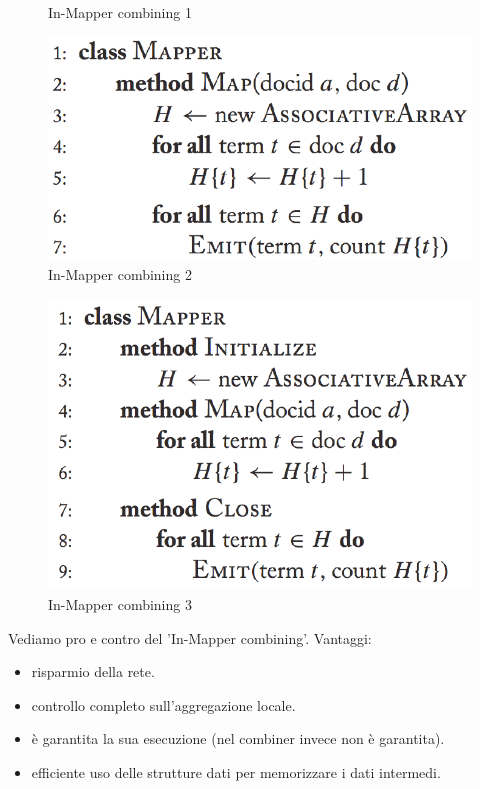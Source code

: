 \documentclass{article}
\begin{document}
\begin{appendices}
\begin{figure}[H]
    \caption{In-Mapper combining 1}
    \label{Code1}
\end{figure}
\begin{figure}[H]
    \centering
    \includegraphics[scale=0.5]{img/In_mapper2.PNG}
    \caption{In-Mapper combining 2}
    \label{Code2}
\end{figure}
\begin{figure}[H]
    \centering
    \includegraphics[scale=0.5]{img/In_mapper3.PNG}
    \caption{In-Mapper combining 3}
    \label{Code3}
\end{figure}
Vediamo pro e contro del 'In-Mapper combining'.
Vantaggi:
\begin{itemize}
    \item risparmio della rete.
    \item controllo completo sull'aggregazione locale.  
    \item è garantita la sua esecuzione (nel combiner invece non è garantita).
    \item efficiente uso delle strutture dati per memorizzare i dati intermedi.

\end{itemize}
\end{appendices}
\end{document}
